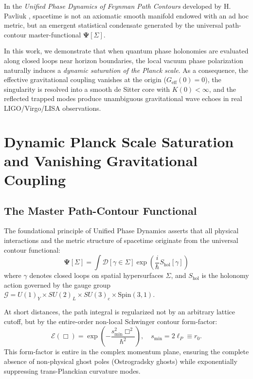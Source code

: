 \documentclass[11pt,a4paper]{article}
\begin{document}
In the \textit{Unified Phase Dynamics of Feynman Path Contours} developed by H. Pavliuk \cite{pavliuk2024monograph}, spacetime is not an axiomatic smooth manifold endowed with an ad hoc metric, but an emergent statistical condensate generated by the universal path-contour master-functional $\mathbf{\Psi}[\Sigma]$. 

In this work, we demonstrate that when quantum phase holonomies are evaluated along closed loops near horizon boundaries, the local vacuum phase polarization naturally induces a \textit{dynamic saturation of the Planck scale}. As a consequence, the effective gravitational coupling vanishes at the origin ($G_{\mathrm{eff}}(0) = 0$), the singularity is resolved into a smooth de Sitter core with $K(0) < \infty$, and the reflected trapped modes produce unambiguous gravitational wave echoes in real LIGO/Virgo/LISA observations.

\section{Dynamic Planck Scale Saturation and Vanishing Gravitational Coupling}

\subsection{The Master Path-Contour Functional}
The foundational principle of Unified Phase Dynamics asserts that all physical interactions and the metric structure of spacetime originate from the universal contour functional:
\begin{equation}
\mathbf{\Psi}[\Sigma] = \int \mathcal{D}[\gamma \in \Sigma] \exp\left( \frac{i}{\hbar} S_{\mathrm{hol}}[\gamma] \right)
\end{equation}
where $\gamma$ denotes closed loops on spatial hypersurfaces $\Sigma$, and $S_{\mathrm{hol}}$ is the holonomy action governed by the gauge group $\mathcal{G} = U(1)_Y \times SU(2)_L \times SU(3)_c \times \mathrm{Spin}(3,1)$.

At short distances, the path integral is regularized not by an arbitrary lattice cutoff, but by the entire-order non-local Schwinger contour form-factor:
\begin{equation}
\mathcal{E}(\Box) = \exp\left( -\frac{s_{\min}^2 \Box^2}{\hbar^2} \right), \quad s_{\min} = 2\ell_P \equiv r_0.
\end{equation}
This form-factor is entire in the complex momentum plane, ensuring the complete absence of non-physical ghost poles (Ostrogradsky ghosts) while exponentially suppressing trans-Planckian curvature modes.
\end{document}
